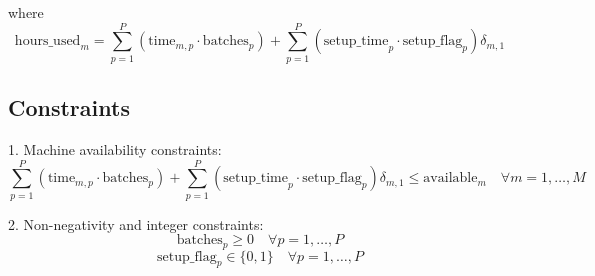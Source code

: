 \documentclass{article}
\begin{document}
where
\[
\text{hours\_used}_{m} = \sum_{p=1}^{P} \left( \text{time}_{m,p} \cdot \text{batches}_{p} \right) + \sum_{p=1}^{P} \left( \text{setup\_time}_{p} \cdot \text{setup\_flag}_{p} \right) \delta_{m,1}
\]

\subsection*{Constraints}
1. Machine availability constraints:
\[
\sum_{p=1}^{P} \left( \text{time}_{m,p} \cdot \text{batches}_{p} \right) + \sum_{p=1}^{P} \left( \text{setup\_time}_{p} \cdot \text{setup\_flag}_{p} \right) \delta_{m,1} \leq \text{available}_{m} \quad \forall m = 1, \ldots, M
\]

2. Non-negativity and integer constraints:
\[
\text{batches}_{p} \geq 0 \quad \forall p = 1, \ldots, P
\]
\[
\text{setup\_flag}_{p} \in \{0, 1\} \quad \forall p = 1, \ldots, P
\]
\end{document}
